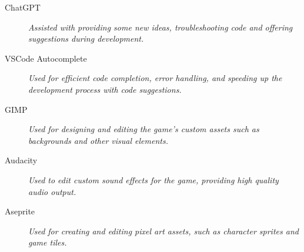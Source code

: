 \documentclass[10.5pt]{article}
\begin{document}
\begin{description}
    \item[ChatGPT] 
    \textit{Assisted with providing some new ideas, troubleshooting code and offering suggestions during development.}
    
    \item[VSCode Autocomplete] 
    \textit{Used for efficient code completion, error handling, and speeding up the development process with code suggestions.}
    
    \item[GIMP] 
    \textit{Used for designing and editing the game’s custom assets such as backgrounds and other visual elements.}
    
    \item[Audacity] 
    \textit{Used to edit custom sound effects for the game, providing high quality audio output.}
    
    \item[Aseprite] 
    \textit{Used for creating and editing pixel art assets, such as character sprites and game tiles.}

\end{description}
\end{document}
